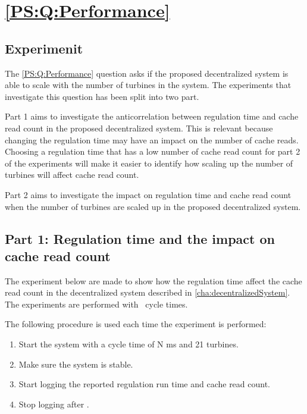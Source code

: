 
\section{\ref{PS:Q:Performance}}
\subsection{Experimenit}
\label{sec:Exper:perfom}


The \ref{PS:Q:Performance} question asks if the proposed decentralized system is able to scale with the number of turbines in the system. The experiments that investigate this question has been split into two part. \newline

Part 1 aims to investigate the anticorrelation between regulation time and cache read count in the proposed decentralized system. This is relevant because changing the regulation time may have an impact on the number of cache reads. Choosing a regulation time that has a low number of cache read count for part 2 of the experiments will make it easier to identify how scaling up the number of turbines will affect cache read count. \newline

Part 2 aims to investigate the impact on regulation time and cache read count when the number of turbines are scaled up in the proposed decentralized system. \newline

\subsection{Part 1: Regulation time and the impact on cache read count}
\label{subsec:Exper:perfom:1}
The experiment below are made to show how the regulation time affect the cache read count in the decentralized system described in \cref{cha:decentralizedSystem}. 
The experiments are performed with \testCycletimeNumbers ~cycle times.  

The following procedure is used each time the experiment is performed:
\begin{enumerate}
	\item Start the system with a cycle time of N ms and 21 turbines.
	\item Make sure the system is stable.
	\item Start logging the reported regulation run time and cache read count.
	\item Stop logging after \experiemntRunTime.
\end{enumerate}

